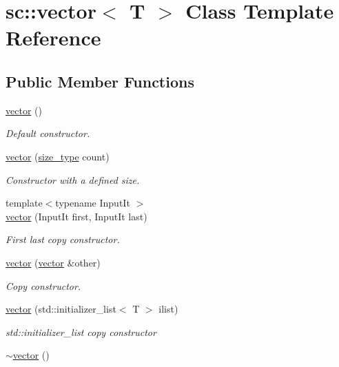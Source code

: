 \hypertarget{classsc_1_1vector}{}\section{sc\+:\+:vector$<$ T $>$ Class Template Reference}
\label{classsc_1_1vector}
\subsection*{Public Member Functions}
\begin{DoxyCompactItemize}
\item 
\hyperlink{classsc_1_1vector_a8ceb2f122374a0fe1c645ebe5e759279}{vector} ()
\begin{DoxyCompactList}\small\item\em Default constructor. \end{DoxyCompactList}\item 
\hyperlink{classsc_1_1vector_a641fcc38459aee8e3bdf86abb5f9d193}{vector} (\hyperlink{classsc_1_1vector_aa4500ebad5be45f8d469fc4b5d62b19d}{size\+\_\+type} count)
\begin{DoxyCompactList}\small\item\em Constructor with a defined size. \end{DoxyCompactList}\item 
{\footnotesize template$<$typename Input\+It $>$ }\\\hyperlink{classsc_1_1vector_ab58c55200c6a120b9d24793a271512fb}{vector} (Input\+It first, Input\+It last)
\begin{DoxyCompactList}\small\item\em First last copy constructor. \end{DoxyCompactList}\item 
\hyperlink{classsc_1_1vector_abfaa009f13bf79958138f4172ab069bf}{vector} (\hyperlink{classsc_1_1vector}{vector} \&other)
\begin{DoxyCompactList}\small\item\em Copy constructor. \end{DoxyCompactList}\item 
\hyperlink{classsc_1_1vector_a431bb1411ec9a488b68b0eed9d8b5727}{vector} (std\+::initializer\+\_\+list$<$ T $>$ ilist)
\begin{DoxyCompactList}\small\item\em std\+::initializer\+\_\+list copy constructor \end{DoxyCompactList}\item 
\hyperlink{classsc_1_1vector_a024d736c8ec23f0bc187a4a0e59b2da5}{$\sim$vector} ()

\end{DoxyCompactItemize}
